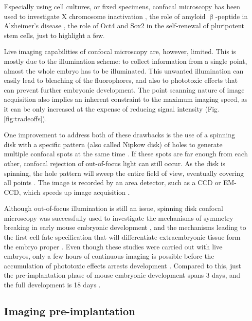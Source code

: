   Especially using cell cultures, or fixed specimens, confocal microscopy has been used to investigate X chromosome inactivation \cite{costanzi_histone_1998}, the role of amyloid $\upbeta$-peptide in Alzheimer's disease \cite{bard_peripherally_2000}, the role of Oct4 \cite{nichols_formation_1998} and Sox2 \cite{avilion_multipotent_2003} in the self-renewal of pluripotent stem cells, just to highlight a few.

  Live imaging capabilities of confocal microscopy are, however, limited. This is mostly due to the illumination scheme: to collect information from a single point, almost the whole embryo has to be illuminated. This unwanted illumination can easily lead to bleaching of the fluorophores, and also to phototoxic effects that can prevent further embryonic development. The point scanning nature of image acquisition also implies an inherent constraint to the maximum imaging speed, as it can be only increased at the expense of reducing signal intensity (Fig. \ref{fig:tradeoffs}).

  One improvement to address both of these drawbacks is the use of a spinning disk with a specific pattern (also called Nipkow disk) of holes to generate multiple confocal spots at the same time \cite{graf_live_2005}. If these spots are far enough from each other, confocal rejection of out-of-focus light can still occur. As the disk is spinning, the hole pattern will sweep the entire field of view, eventually covering all points \cite{kino_intermediate_1990}. The image is recorded by an area detector, such as a CCD or EM-CCD, which speeds up image acquisition \cite{nakano_spinning-disk_2002}.

  Although out-of-focus illumination is still an issue, spinning disk confocal microscopy was successfully used to investigate the mechanisms of symmetry breaking in early mouse embryonic development \cite{korotkevich_apical_2017}, and the mechanisms leading to the first cell fate specification that will differentiate extraembryonic tissue form the embryo proper \cite{maitre_pulsatile_2015,dietrich_venus_2015,maitre_asymmetric_2016}. Even though these studies were carried out with live embryos, only a few hours of continuous imaging is possible before the accumulation of phototoxic effects arrests development \cite{nowotschin_chapter_2010}. Compared to this, just the pre-implantation phase of mouse embryonic development spans 3 days, and the full development is 18 days \cite{wolpert_principles_2011}.


  \subsection{Imaging pre-implantation}

